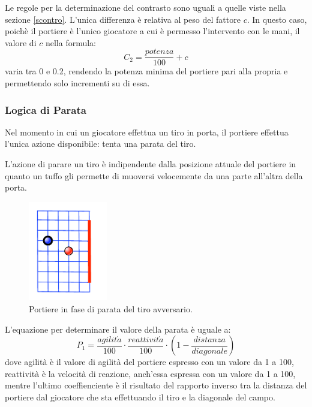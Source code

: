 \documentclass[aps,letterpaper,10pt]{article}
\begin{document}
Le regole per la determinazione del contrasto sono uguali a quelle viste nella sezione \ref{scontro}. L'unica differenza \`e relativa al peso del fattore $c$. In questo caso, poich\`e il portiere \`e l'unico giocatore a cui \`e permesso l'intervento con le mani, il valore di $c$ nella formula: $$ C_2 = \frac{potenza}{100} + c $$ varia tra 0 e 0.2, rendendo la potenza minima del portiere pari alla propria e permettendo solo incrementi su di essa.

\subsubsection{Logica di Parata}
\label{parata}

Nel momento in cui un giocatore effettua un tiro in porta, il portiere effettua l'unica azione disponibile: tenta una parata del tiro. \vspace{3mm}

L'azione di parare un tiro \`e indipendente dalla posizione attuale del portiere in quanto un tuffo gli permette di muoversi velocemente da una parte all'altra della porta. 

\begin{figure}[H]
	\begin{center}
		\includegraphics[width=130px]{images/save.pdf}
	\end{center}
\caption{Portiere in fase di parata del tiro avversario.}
\end{figure}

L'equazione per determinare il valore della parata \`e uguale a: $$ P_1 = \frac{agilit\grave{a}}{100} \cdot \frac{reattivit\grave{a}}{100} \cdot \left( 1-\frac{distanza}{diagonale} \right) $$ dove agilit\`a \`e il valore di agilit\`a del portiere espresso con un valore da 1 a 100, reattivit\`a \`e la velocit\`a di reazione, anch'essa espressa con un valore da 1 a 100, mentre l'ultimo coeffienciente \`e il risultato del rapporto inverso tra la distanza del portiere dal giocatore che sta effettuando il tiro e la diagonale del campo. \vspace{3mm}
\end{document}
